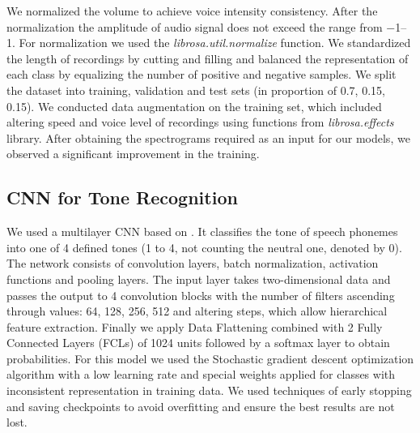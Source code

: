 \documentclass[conference]{IEEEtran}
\begin{document}
We normalized the volume to achieve voice intensity consistency. After the normalization the amplitude of audio signal does not exceed the range from \numrange[range-phrase =\text{ to }]{-1}{1}. For normalization we used the \textit{librosa.util.normalize} function.
We standardized the length of recordings by cutting and filling and balanced the representation of each class by equalizing the number of positive and negative samples.
We split the dataset into training, validation and test sets (in proportion of 0.7, 0.15, 0.15). We conducted data augmentation on the training set, which included altering speed and voice level of recordings using functions from \textit{librosa.effects} library.
After obtaining the spectrograms required as an input for our models, we observed a significant improvement in the training.

\subsection{CNN for Tone Recognition}
We used a multilayer CNN based on \cite{Gao2019ToneNetAC}. It classifies the tone of speech phonemes into one of 4 defined tones (1 to 4, not counting the neutral one, denoted by 0). The network consists of convolution layers, batch normalization, activation functions and pooling layers.
The input layer takes two-dimensional data and passes the output to 4 convolution blocks with the number of filters ascending through values: 64, 128, 256, 512 and altering steps, which allow hierarchical feature extraction. Finally we apply Data Flattening combined with 2 Fully Connected Layers (FCLs) of 1024 units followed by a softmax layer to obtain probabilities.
For this model we used the Stochastic gradient descent optimization algorithm \cite{sung2020ssgdsymmetricalstochasticgradient} with a low learning rate and special weights applied for classes with inconsistent representation in training data.
We used techniques of early stopping and saving checkpoints to avoid overfitting and ensure the best results are not lost.
\end{document}
